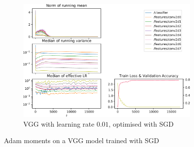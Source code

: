 \begin{figure}
    \begin{subfigure}{\textwidth}
        \centering
        \includegraphics[width=\linewidth]{gfx/diagrams/experiments/adam/vgg_sgd_001_0_-1.pdf}
        \caption{VGG with learning rate $0.01$, optimised with SGD}
    \end{subfigure}
    \label{fig:vgg-experiment-sgd}
    \caption{Adam moments on a VGG model trained with SGD}
\end{figure}
